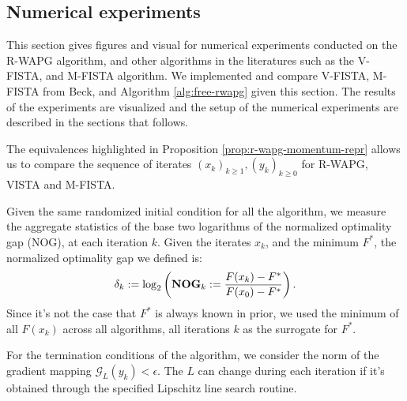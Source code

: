 \documentclass[12pt]{article}
\begin{document}
    \subsection{Numerical experiments}
        This section gives figures and visual for numerical experiments conducted on the R-WAPG algorithm, and other algorithms in the literatures such as the V-FISTA, and M-FISTA algorithm. 
        We implemented and compare V-FISTA, M-FISTA from Beck, and Algorithm \ref{alg:free-rwapg} given this section. 
        The results of the experiments are visualized and the setup of the numerical experiments are described  in the sections that follows. 
        \par
        The equivalences highlighted in Proposition \ref{prop:r-wapg-momentum-repr} allows us to compare the sequence of iterates $(x_k)_{k \ge 1}, (y_k)_{k \ge0}$ for R-WAPG, VISTA and M-FISTA. 
        \par
        Given the same randomized initial condition for all the algorithm, we measure the aggregate statistics of the base two logarithms of the normalized optimality gap (NOG), at each iteration $k$.  
        Given the iterates $x_k$, and the minimum $F^*$, the normalized optimality gap we defined is: 
        \newcommand{\NOG}{\text{\textbf{NOG}}}
        \begin{align*}
            \delta_k := \log_2\left(
                \NOG_k := \frac{F(x_k) - F^*}{F(x_0) - F^*}
            \right). 
        \end{align*}
        Since it's not the case that $F^*$ is always known in prior, we used the minimum of all $F(x_k)$ across all algorithms, all iterations $k$ as the surrogate for $F^*$. 
        \par 
        For the termination conditions of the algorithm, we consider the norm of the gradient mapping $\mathcal G_L(y_k) < \epsilon$. 
        The $L$ can change during each iteration if it's obtained through the specified Lipschitz line search routine. 
\end{document}
